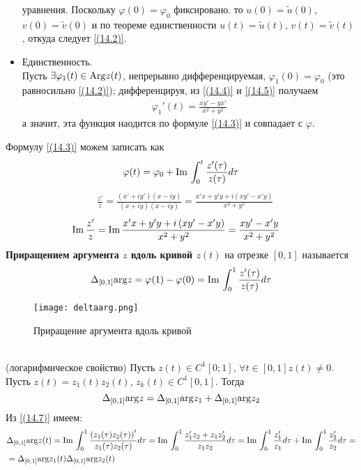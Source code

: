 \begin{itemize}
    уравнения. Поскольку $\varphi(0) = \varphi_0$ фиксировано. то $u(0) =
    \tilde{u}(0)$, $v(0) = \tilde{v}(0)$ и по теореме единственности $u(t) =
    \tilde{u}(t)$, $v(t) = \tilde{v}(t)$, откуда следует \eqref{(14.2)}.
    \item Единственность.
    \\
    Пусть $\exists \varphi_1(t) \in \mathrm{Arg} z(t)$, непрерывно дифференцируемая,
    $\varphi_1(0) = \varphi_0$ (это равносильно \eqref{(14.2)}); дифференцируя,
    из \eqref{(14.4)} и \eqref{(14.5)} получаем
    \begin{align*}
      \varphi_1'(t) = \frac{xy'-yx'}{x^2+y^2}
    \end{align*}
    а значит, эта функция наодится по формуле \eqref{(14.3)} и совпадает с $\varphi$.
\end{itemize}
\note
Формулу \eqref{(14.3)} можем записать как
\begin{equation}\label{(14.6)}
    \varphi(t) = \varphi_0 + \mathrm{Im}\, \int_{0}^t \frac{z'(\tau)}{z(\tau)}d \tau
\end{equation}
\pr
\begin{align*}
  & \frac{z'}{z} = \frac{\left( x'+iy' \right)\left( x-iy \right)}{\left( x+iy \right)\left( x-iy \right)} = \frac{x'x+y'y+i\left( xy'-x'y \right)}{x^2+y^2}
\end{align*}
\begin{align*}
  & \mathrm{Im}\, \frac{z'}{z} = \mathrm{Im}\, \frac{x'x+y'y+i\left( xy'-x'y \right)}{x^2+y^2} = \frac{xy'-x'y}{x^2+y^2}
\end{align*}
\Def
\textbf{Приращением аргумента $z$ вдоль кривой $z(t)$} на отрезке $[0,1]$
называется
\begin{equation}\label{(14.7)}
    \Delta_{[0,1]}\mathrm{arg} z = \varphi(1) - \varphi(0) = \mathrm{Im}\, \int_{0}^1 \frac{z'(\tau)}{z(\tau)}d \tau
\end{equation}
\begin{figure}[h!]
		\centering
		\texttt{[image: deltaarg.png]}
    \caption{Приращение аргумента вдоль кривой}
		\label{fig:14.1}
\end{figure}\\
\theorem (логарифмическое свойство)
Пусть $z(t) \in C^1[0;1]$, $\forall t \in [0,1] z(t) \neq 0$. Пусть $z(t) =
z_1(t)z_2(t)$, $z_k(t) \in C^1[0,1]$. Тогда
\begin{equation}\label{(14.8)}
    \Delta_{[0,1]}\mathrm{arg} z = \Delta_{[0,1]}\mathrm{arg} z_1 + \Delta_{[0,1]}\mathrm{arg} z_2
\end{equation}
\pr
Из \eqref{(14.7)} имеем:
\begin{align*}
  & \Delta_{[0,1]} \mathrm{arg} z(t) = \mathrm{Im}\, \int_{0}^{1}\frac{\left( z_1(\tau)z_2(\tau) \right)'}{z_1(\tau)z_2(\tau)}d \tau =\mathrm{Im}\, \int_{0}^{1}\frac{z_1'z_2+z_1z_2'}{z_1z_2}d \tau = \mathrm{Im}\, \int_{0}^{1}\frac{z_1'}{z_1}d \tau + \mathrm{Im}\, \int_{0}^{1}\frac{z_2'}{z_2}d \tau = \\
  & = \Delta_{[0,1]} \mathrm{arg} z_1(t) \Delta_{[0,1]} \mathrm{arg} z_2(t) 
\end{align*}
